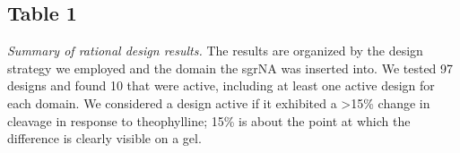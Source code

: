 \documentclass{article}
\newcommand\captitle{\textit}
\newcommand\beginsupplement{%
   \setcounter{table}{0}
   \renewcommand{\thetable}{S\arabic{table}}%
   \setcounter{figure}{0}
   \renewcommand{\thefigure}{S\arabic{figure}}%
}
\begin{document}
\subsection{Table 1}

\captitle{Summary of rational design results.}  The results are organized by 
the design strategy we employed and the domain the sgrNA was inserted into.  We 
tested 97 designs and found 10 that were active, including at least one active 
design for each domain.  We considered a design active if it exhibited a >15\% 
change in cleavage in response to theophylline; 15\% is about the point at 
which the difference is clearly visible on a gel.


\printbibliography[title=References]

\beginsupplement
\end{document}
